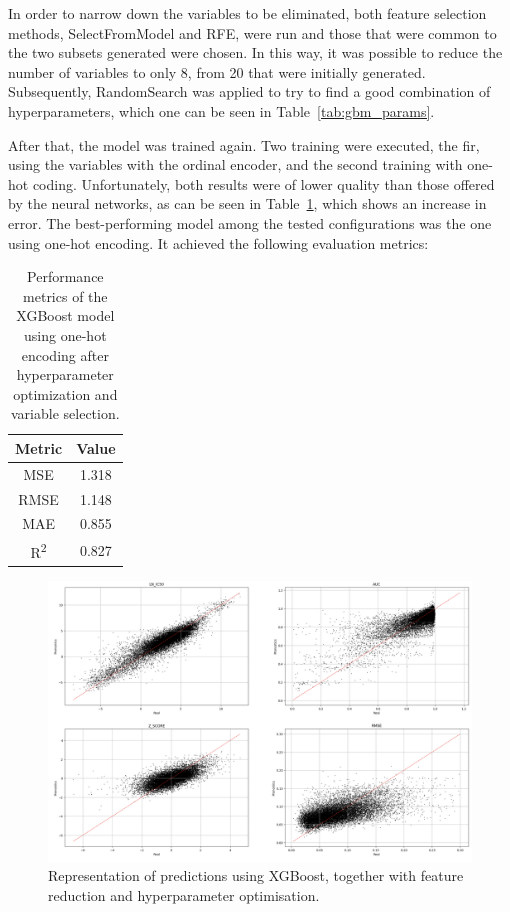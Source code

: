 In order to narrow down the variables to be eliminated, both feature selection methods, SelectFromModel and RFE, were run and those that were common to the two subsets generated were chosen. In this way, it was possible to reduce the number of variables to only 8, from 20 that were initially generated. Subsequently, RandomSearch was applied to try to find a good combination of hyperparameters, which one can be seen in Table~\ref{tab:gbm_params}. 

After that, the model was trained again. Two training were executed, the fir, using the variables with the ordinal encoder, and the second training with one-hot coding. Unfortunately, both results were of lower quality than those offered by the neural networks, as can be seen in Table~\ref{tab:xgboost_metrics_reducted}, which shows an increase in error. The best-performing model among the tested configurations was the one using one-hot encoding. It achieved the following evaluation metrics:

\begin{table}[H]
    \centering
    \begin{tabular}{|c|c|}
    \hline
    \textbf{Metric} & \textbf{Value} \\
    \hline
    MSE & 1.318 \\
    RMSE & 1.148 \\
    MAE & 0.855 \\
    R\textsuperscript{2} & 0.827 \\
    \hline
    \end{tabular}
    \caption{Performance metrics of the XGBoost model using one-hot encoding after hyperparameter optimization and variable selection.}
    \label{tab:xgboost_metrics_reducted}
\end{table}

\begin{figure}[H]
    \centering
    \includegraphics[width=1\textwidth]{figures/xgboost_reg/xgboost_optimized_reduced.png}
    \caption{Representation of predictions using XGBoost, together with feature reduction and hyperparameter optimisation.}
    \label{fig:xgboost_opt_red}
\end{figure}

